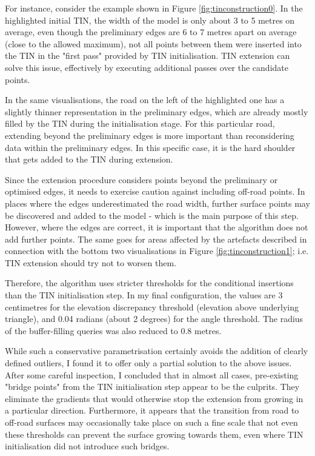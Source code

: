 For instance, consider the example shown in Figure \ref{fig:tinconstruction0}. In the highlighted initial TIN, the width of the model is only about 3 to 5 metres on average, even though the preliminary edges are 6 to 7 metres apart on average (close to the allowed maximum), not all points between them were inserted into the TIN in the "first pass" provided by TIN initialisation. TIN extension can solve this issue, effectively by executing additional passes over the candidate points.

In the same visualisations, the road on the left of the highlighted one has a slightly thinner representation in the preliminary edges, which are already mostly filled by the TIN during the initialisation stage. For this particular road, extending beyond the preliminary edges is more important than reconsidering data within the preliminary edges. In this specific case, it is the hard shoulder that gets added to the TIN during extension.

Since the extension procedure considers points beyond the preliminary or optimised edges, it needs to exercise caution against including off-road points. In places where the edges underestimated the road width, further surface points may be discovered and added to the model - which is the main purpose of this step. However, where the edges are correct, it is important that the algorithm does not add further points. The same goes for areas affected by the artefacts described in connection with the bottom two visualisations in Figure \ref{fig:tinconstruction1}; i.e. TIN extension should try not to worsen them.

Therefore, the algorithm uses stricter thresholds for the conditional insertions than the TIN initialisation step. In my final configuration, the values are 3 centimetres for the elevation discrepancy threshold (elevation above underlying triangle), and 0.04 radians (about 2 degrees) for the angle threshold. The radius of the buffer-filling queries was also reduced to 0.8 metres.

While such a conservative parametrisation certainly avoids the addition of clearly defined outliers, I found it to offer only a partial solution to the above issues. After some careful inspection, I concluded that in almost all cases, pre-existing "bridge points" from the TIN initialisation step appear to be the culprits. They eliminate the gradients that would otherwise stop the extension from growing in a particular direction. Furthermore, it appears that the transition from road to off-road surfaces may occasionally take place on such a fine scale that not even these thresholds can prevent the surface growing towards them, even where TIN initialisation did not introduce such bridges.

